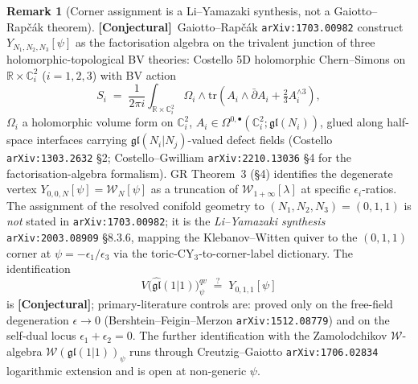 \documentclass[11pt]{amsart}
\theoremstyle{definition}
\newtheorem{remark}[theorem]{Remark}
\providecommand{\cW}{\mathcal{W}}
\providecommand{\R}{\mathbb{R}}
\providecommand{\C}{\mathbb{C}}
\providecommand{\fgl}{\mathfrak{gl}}
\providecommand{\ClaimStatusConjectured}{\textbf{\textsf{[Conjectural]}}}
\begin{document}
\begin{remark}[Corner assignment is a Li--Yamazaki synthesis, not a Gaiotto--Rapčák theorem]
\label{rem:corner-assignment-scope}
\ClaimStatusConjectured\
Gaiotto--Rapčák \texttt{arXiv:1703.00982} construct $Y_{N_1, N_2, N_3}[\psi]$
as the factorisation algebra on the trivalent junction of three
holomorphic-topological BV theories: Costello 5D holomorphic Chern--Simons
on $\R\times\C^2_i$ ($i=1,2,3$) with BV action
\[
  S_i \;=\; \frac{1}{2\pi i}\int_{\R\times\C^2_i}\!\Omega_i\wedge
  \mathrm{tr}\!\left(A_i\wedge\bar\partial A_i + \tfrac{2}{3} A_i^{\wedge 3}\right),
\]
$\Omega_i$ a holomorphic volume form on $\C^2_i$, $A_i \in
\Omega^{0,\bullet}(\C^2_i;\fgl(N_i))$, glued along half-space interfaces
carrying $\fgl(N_i|N_j)$-valued defect fields (Costello
\texttt{arXiv:1303.2632} \S2; Costello--Gwilliam \texttt{arXiv:2210.13036}
\S4 for the factorisation-algebra formalism). GR Theorem~3 (\S4) identifies
the degenerate vertex $Y_{0,0,N}[\psi] = \cW_N[\psi]$ as a truncation of
$\cW_{1+\infty}[\lambda]$ at specific $\epsilon_i$-ratios. The assignment
of the resolved conifold geometry to $(N_1, N_2, N_3) = (0,1,1)$ is \emph{not}
stated in \texttt{arXiv:1703.00982}; it is the \emph{Li--Yamazaki synthesis}
\texttt{arXiv:2003.08909} §8.3.6, mapping the Klebanov--Witten quiver to
the $(0,1,1)$ corner at $\psi = -\epsilon_1/\epsilon_3$ via the
toric-CY$_3$-to-corner-label dictionary. The identification
\[
  V\bigl(\widehat{\fgl}(1|1)\bigr)^{qv}_\psi
  \;\stackrel{?}{=}\; Y_{0,1,1}[\psi]
\]
is \ClaimStatusConjectured; primary-literature controls are: proved only
on the free-field degeneration $\epsilon\to 0$ (Bershtein--Feigin--Merzon
\texttt{arXiv:1512.08779}) and on the self-dual locus
$\epsilon_1+\epsilon_2=0$. The further identification with the Zamolodchikov
$\cW$-algebra $\cW(\fgl(1|1))_\psi$ runs through Creutzig--Gaiotto
\texttt{arXiv:1706.02834} logarithmic extension and is open at non-generic
$\psi$.
\end{remark}
\end{document}
